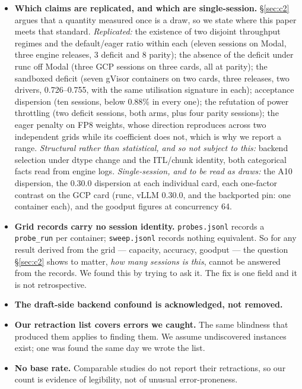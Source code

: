 \documentclass[11pt]{article}
\newcommand{\tw}[1]{\texttt{\small #1}}
\begin{document}
\begin{itemize}
control --- for instance against a zero-latency mock server --- so this rests
on a load-regime argument rather than on a measurement of our own harness.
\item \textbf{Which claims are replicated, and which are single-session.}
\S\ref{sec:c2} argues that a quantity measured once is a draw, so we state
where this paper meets that standard. \emph{Replicated:} the existence of two disjoint
throughput regimes and the default/eager ratio within each (eleven sessions
on Modal, three engine releases, 3 deficit and 8 parity); the absence of
the deficit under runc off Modal (three GCP sessions on three cards, all at
parity); the sandboxed deficit (seven gVisor containers on two cards,
three releases, two drivers, 0.726--0.755, with the same utilisation
signature in each); acceptance dispersion
(ten sessions, below 0.88\% in every one); the refutation of power
throttling (two deficit sessions, both arms, plus four parity sessions); the eager penalty
on FP8 weights, whose direction reproduces across two independent grids
while its coefficient does not, which is why we report a range.
\emph{Structural rather than statistical, and so not subject to this:}
backend selection under dtype change and the ITL/chunk identity, both
categorical facts read from engine logs. \emph{Single-session, and to be
read as draws:} the A10 dispersion, the 0.30.0 dispersion at each individual
card, each one-factor contrast on the GCP card (runc, vLLM 0.30.0, and the
backported pin: one container each), and the goodput figures at
concurrency 64.
\item \textbf{Grid records carry no session identity.} \tw{probes.jsonl}
records a \tw{probe\_run} per container; \tw{sweep.jsonl} records nothing
equivalent. So for any result derived from the grid --- capacity, accuracy,
goodput --- the question \S\ref{sec:c2} shows to matter, \emph{how many
sessions is this}, cannot be answered from the records. We found this by
trying to ask it. The fix is one field and it is not retrospective.
\item \textbf{The draft-side backend confound is acknowledged, not removed.}
\item \textbf{Our retraction list covers errors we caught.} The same
blindness that produced them applies to finding them. We assume undiscovered
instances exist; one was found the same day we wrote the list.
\item \textbf{No base rate.} Comparable studies do not report their
retractions, so our count is evidence of legibility, not of unusual
error-proneness.
\end{itemize}
\end{document}
